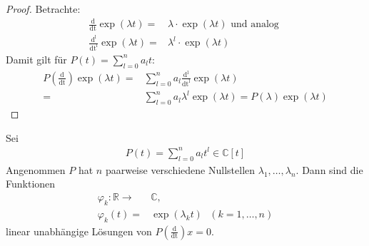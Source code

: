 \begin{proof}
	Betrachte: 
	\begin{align*}
		\frac{\mathrm{d}}{\mathrm{dt}} \exp(\lambda t) = &  
			\lambda \cdot \exp(\lambda t) \text{ und analog } \\
		\frac{\mathrm{d^l}}{\mathrm{dt^l}} \exp(\lambda t)  
				= & \lambda^l \cdot \exp(\lambda t)
\end{align*}		
	Damit gilt für  $P(t) =\sum_{l=0}^n a_l t $:
	\begin{align*}
		P\left(\frac{\mathrm{d}}{\mathrm{dt}}\right) \exp(\lambda t) = &
		\sum_{l=0}^n a_l \frac{\mathrm{d^l}}{\mathrm{dt^l}}\exp(\lambda t) \\ 
		= & \sum_{l= 0}^n a_l \lambda^l \exp(\lambda t)
		= P(\lambda) \exp(\lambda t)
	\end{align*}
\end{proof}

\begin{Satz}{
	Sei 
	\begin{align*}
		P(t) = \sum_{l=0}^n a_l t^l \in \mathbb{C}[t]
	\end{align*}
	Angenommen $P$ hat $n$ paarweise verschiedene Nullstellen 
	$\lambda_1, \hdots, \lambda_n$. Dann sind die Funktionen
	\begin{align*}
		\varphi_k : \mathbb{R} \rightarrow & \mathbb{C}, \\
		\varphi_k(t) = & \exp(\lambda_k t) \text{ } (k = 1, \hdots, n)
	\end{align*}
	linear unabhängige Lösungen von $P\left(\frac{\mathrm{d}}{\mathrm{dt}}\right) x = 0$.
}\end{Satz}


